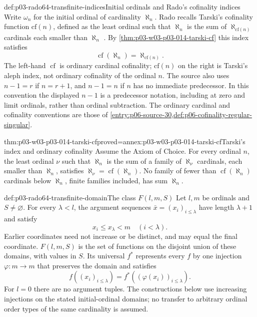\begin{hbconvention}{def:p03-rado64-transfinite-indices}{Initial ordinals and Rado's cofinality indices}
Write \(\omega_n\) for the initial ordinal of cardinality \(\aleph_n\).
Rado recalls Tarski's cofinality function \(\mathrm{cf}(n)\), defined as
the least ordinal such that \(\aleph_n\) is the sum of
\(\aleph_{\mathrm{cf}(n)}\) cardinals each smaller than \(\aleph_n\)
\cite[\S4.1, p.~337]{Rado1964}. By
\cref{thm:p03-w03-p03-014-tarski-cf} this index satisfies
\[
 \operatorname{cf}(\aleph_n)=\aleph_{\mathrm{cf}(n)}.
\]
The left-hand \(\operatorname{cf}\) is ordinary cardinal cofinality;
\(\mathrm{cf}(n)\) on the right is Tarski's aleph index, not ordinary
cofinality of the ordinal \(n\). The source also uses \(n-1=r\) if
\(n=r+1\), and \(n-1=n\) if \(n\) has no immediate predecessor.
In this convention the displayed \(n-1\) is a predecessor notation,
including at zero and limit ordinals, rather than ordinal subtraction.
The ordinary cardinal and cofinality conventions are those of
\cref{entry:p06-source-30,def:p06-cofinality-regular-singular}.
\end{hbconvention}

\begin{hblemma}{thm:p03-w03-p03-014-tarski-cf}{proved=annex:p03-w03-p03-014-tarski-cf}{Tarski's index and ordinary cofinality}
Assume the Axiom of Choice. For every ordinal \(n\), the least ordinal
\(\nu\) such that \(\aleph_n\) is the sum of a family of
\(\aleph_\nu\) cardinals, each smaller than \(\aleph_n\), satisfies
\(\aleph_\nu=\operatorname{cf}(\aleph_n)\). No family of fewer than
\(\operatorname{cf}(\aleph_n)\) cardinals below \(\aleph_n\), finite
families included, has sum \(\aleph_n\).
\end{hblemma}

\begin{hbdefinition}{def:p03-rado64-transfinite-domain}{The class \(F(l,m,S)\)}
Let \(l,m\) be ordinals and \(S\ne\varnothing\).
For every \(\lambda<l\), the argument sequences
\(\bar x=(x_i)_{i\leq\lambda}\) have length \(\lambda+1\) and satisfy
\[
 x_i\leq x_\lambda<m\quad(i<\lambda).
\]
Earlier coordinates need not increase or be distinct, and may equal the
final coordinate. \(F(l,m,S)\) is the set of functions on the disjoint union
of these domains, with values in \(S\).
Its universal \(f^*\) represents every \(f\) by one injection \(\varphi:m\to m\)
that preserves the domain and satisfies
\[
 f((x_i)_{i\leq\lambda})=f^*((\varphi(x_i))_{i\leq\lambda}).
\]
For \(l=0\) there are no argument tuples. The constructions below use
increasing injections on the stated initial-ordinal domains; no transfer
to arbitrary ordinal order types of the same cardinality is assumed.
\end{hbdefinition}

